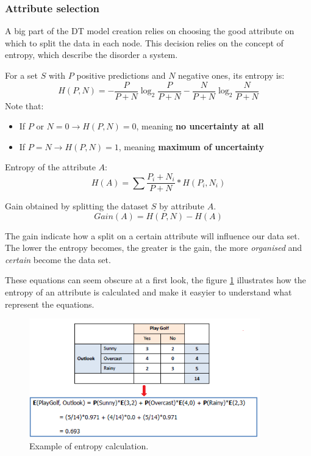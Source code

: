 \subsubsection{Attribute selection}
\label{sec:selection}

A big part of the DT model creation relies on choosing the good attribute on which to split the data in each node. This decision relies on the concept of entropy, which describe the disorder a system.

For a set $S$ with $P$ positive predictions and $N$ negative ones, its entropy is:
$$
 H(P,N)=-\frac{P}{P+N}\log_2\frac{P}{P+N}-\frac{N}{P+N}\log_2\frac{N}{P+N}
$$
Note that:
\begin{itemize}
 \item If $P \text{ or } N=0 \rightarrow H(P,N)=0$, meaning \textbf{no uncertainty at all}
 \item If $P=N \rightarrow H(P,N)=1$, meaning \textbf{maximum of uncertainty}
\end{itemize}

Entropy of the attribute $A$:
$$
H(A) = \sum \frac{P_i + N_i}{P + N} * H(P_i, N_i)
$$

Gain obtained by splitting the dataset $S$ by attribute $A$.
$$
Gain(A) = H(P, N) - H(A)
$$

The gain indicate how a split on a certain attribute will influence our data set. The lower the entropy becomes, the greater is the gain, the more \textit{organised} and \textit{certain} become the data set.

These equations can seem obscure at a first look, the figure \ref{pic:entropy} illustrates how the entropy of an attribute is calculated and make it easyier to understand what represent the equations.


\begin{figure}[H]%
 \centering
 \includegraphics[width=10cm]{./img/07/entropy.png}
 \caption{\label{pic:entropy} Example of entropy calculation.}
\end{figure}






